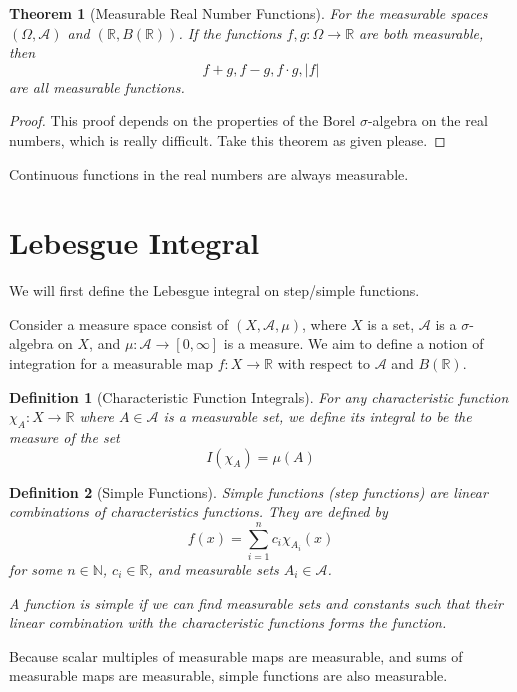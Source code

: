 \documentclass{article}
\newtheorem{theorem}{Theorem}[section]
\newtheorem{defi}{Definition}[section]
\begin{document}
\begin{theorem}[Measurable Real Number Functions]
    For the measurable spaces $(\Omega, \mathcal A)$ and $(\mathbb{R}, B(\mathbb{R}))$. If the functions $f,g \colon \Omega \to \mathbb{R}$ are both measurable, then
    \[
        f+g, f-g, f \cdot g, |f|
    \]
    are all measurable functions.
\end{theorem}
\begin{proof}
    This proof depends on the properties of the Borel $\sigma$-algebra on the real numbers, which is really difficult. Take this theorem as given please.
\end{proof}

Continuous functions in the real numbers are always measurable.

\newpage
\section{Lebesgue Integral}
We will first define the Lebesgue integral on step/simple functions.

Consider a measure space consist of $(X, \mathcal A, \mu)$, where $X$ is a set, $\mathcal A$ is a $\sigma$-algebra on $X$, and $\mu \colon \mathcal A \to [0, \infty]$ is a measure. We aim to define a notion of integration for a measurable map $f \colon X \to \mathbb{R}$ with respect to $\mathcal A$ and $B(\mathbb{R})$.

\begin{defi}[Characteristic Function Integrals]
    For any characteristic function $\chi_A \colon X \to \mathbb{R}$ where $A \in \mathcal A$ is a measurable set, we define its integral to be the measure of the set
    \[
        I(\chi_A) = \mu(A)
    \]
\end{defi}

\begin{defi}[Simple Functions]
    Simple functions (step functions) are linear combinations of characteristics functions. They are defined by
    \[
        f(x) = \sum_{i=1}^{n} c_i \chi_{A_i}(x)
    \]
    for some $n \in \mathbb{N}$, $c_i \in \mathbb{R}$, and measurable sets $A_i \in \mathcal A$.

    A function is simple if we can find measurable sets and constants such that their linear combination with the characteristic functions forms the function.
\end{defi}

Because scalar multiples of measurable maps are measurable, and sums of measurable maps are measurable, simple functions are also measurable.
\end{document}
